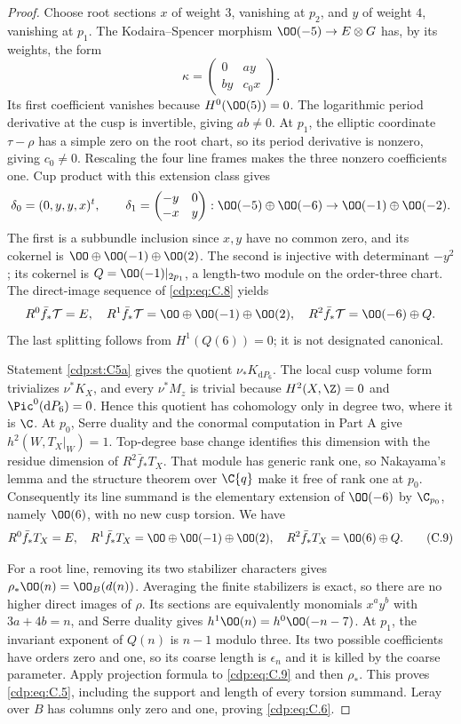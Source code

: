 \begin{proof}
Choose root sections $x$ of weight $3$, vanishing at $p_2$, and $y$ of weight $4$, vanishing at $p_1$. The Kodaira--Spencer morphism $\OO(-5)\to E\otimes G$ has, by its weights, the form
\[
 \kappa=\begin{pmatrix}0&a y\\b y&c_0x\end{pmatrix}.
\]
Its first coefficient vanishes because $H^0(\OO(5))=0$. The logarithmic period derivative at the cusp is invertible, giving $ab\ne0$. At $p_1$, the elliptic coordinate $\tau-\rho$ has a simple zero on the root chart, so its period derivative is nonzero, giving $c_0\ne0$. Rescaling the four line frames makes the three nonzero coefficients one. Cup product with this extension class gives
\[
\delta_0=(0,y,y,x)^t,\qquad
\delta_1=\begin{pmatrix}-y&0\\-x&y\end{pmatrix}:
 \OO(-5)\oplus\OO(-6)\to\OO(-1)\oplus\OO(-2).
\]
The first is a subbundle inclusion since $x,y$ have no common zero, and its cokernel is $\OO\oplus\OO(-1)\oplus\OO(2)$. The second is injective with determinant $-y^2$; its cokernel is
$Q=\OO(-1)|_{2p_1}$, a length-two module on the order-three chart. The direct-image sequence of \eqref{cdp:eq:C.8} yields
\[
 R^0\bar f_*\mathcal T=E,\quad
 R^1\bar f_*\mathcal T=\OO\oplus\OO(-1)\oplus\OO(2),\quad
 R^2\bar f_*\mathcal T=\OO(-6)\oplus Q.
\]
The last splitting follows from $H^1(Q(6))=0$; it is not designated canonical.

Statement \ref{cdp:st:C5a} gives the quotient $\nu_*K_{\mathrm dP_6}$. The local cusp volume form trivializes $\nu^*K_X$, and every $\nu^*M_z$ is trivial because $H^2(X,\Z)=0$ and $\Pic^0(\mathrm dP_6)=0$. Hence this quotient has cohomology only in degree two, where it is $\C$. At $p_0$, Serre duality and the conormal computation in Part A give $h^2(W,T_X|_W)=1$. Top-degree base change identifies this dimension with the residue dimension of $R^2\bar f_*T_X$. That module has generic rank one, so Nakayama's lemma and the structure theorem over $\C\{q\}$ make it free of rank one at $p_0$. Consequently its line summand is the elementary extension of $\OO(-6)$ by $\C_{p_0}$, namely $\OO(6)$, with no new cusp torsion. We have
\[
 R^0\bar f_*T_X=E,\quad
 R^1\bar f_*T_X=\OO\oplus\OO(-1)\oplus\OO(2),\quad
 R^2\bar f_*T_X=\OO(6)\oplus Q.                       \tag{C.9}\label{cdp:eq:C.9}
\]

For a root line, removing its two stabilizer characters gives
$\rho_*\OO(n)=\OO_B(d(n))$. Averaging the finite stabilizers is exact, so there are no higher direct images of $\rho$. Its sections are equivalently monomials $x^ay^b$ with $3a+4b=n$, and Serre duality gives $h^1\OO(n)=h^0\OO(-n-7)$. At $p_1$, the invariant exponent of $Q(n)$ is $n-1$ modulo three. Its two possible coefficients have orders zero and one, so its coarse length is $\epsilon_n$ and it is killed by the coarse parameter. Apply projection formula to \eqref{cdp:eq:C.9} and then $\rho_*$. This proves \eqref{cdp:eq:C.5}, including the support and length of every torsion summand. Leray over $B$ has columns only zero and one, proving \eqref{cdp:eq:C.6}.


\end{proof}
